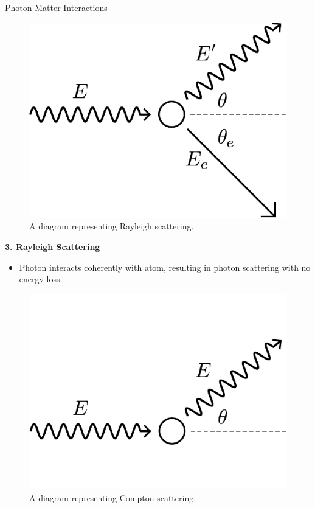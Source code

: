\documentclass[final]{beamer}
\newlength{\colwidth}
\begin{document}
\begin{frame}[t]
\begin{columns}[t]
\begin{column}{\colwidth}
\begin{block}{Photon-Matter Interactions}
\begin{multicols}{2}
\begin{figure}
        \includegraphics[width = 0.4\colwidth]{compton_diagram.pdf}
        \caption{A diagram representing Rayleigh scattering.}
      \end{figure}

    \end{multicols}

    \begin{center}
      \textbf{3. Rayleigh Scattering}
      \begin{itemize}
        \item Photon interacts coherently with atom, resulting in photon scattering with no energy loss.
      \end{itemize}
      \vspace{-2\baselineskip}
      \begin{figure}
        \includegraphics[width = 0.4\colwidth]{rayleigh_diagram.pdf}
        \caption{A diagram representing Compton scattering.}
      \end{figure}
    \end{center}



\end{block}
\end{column}
\end{columns}
\end{frame}
\end{document}
